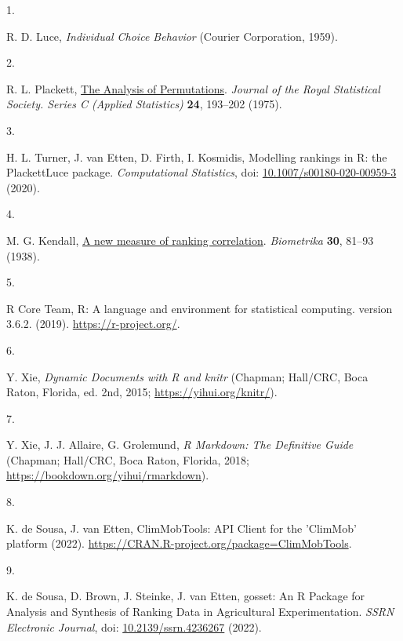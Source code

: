 \documentclass[
]{article}
\newlength{\cslhangindent}
\newlength{\csllabelwidth}
\newenvironment{CSLReferences}[2] %
 {\begin{list}{}{%
  \setlength{\itemindent}{0pt}
  \setlength{\leftmargin}{0pt}
  \setlength{\parsep}{0pt}
  \ifodd #1
   \setlength{\leftmargin}{\cslhangindent}
   \setlength{\itemindent}{-1\cslhangindent}
  \fi
  \setlength{\itemsep}{#2\baselineskip}}}
 {\end{list}}
\newcommand{\CSLLeftMargin}[1]{\parbox[t]{\csllabelwidth}{\strut#1\strut}}
\newcommand{\CSLRightInline}[1]{\parbox[t]{\linewidth - \csllabelwidth}{\strut#1\strut}}
\begin{document}
\label{refs}
\begin{CSLReferences}{0}{1}
\CSLLeftMargin{1. }%
\CSLRightInline{R. D. Luce, \emph{{Individual Choice Behavior}} (Courier
Corporation, 1959).}

\CSLLeftMargin{2. }%
\CSLRightInline{R. L. Plackett,
\href{https://doi.org/10.2307/2346567}{{The Analysis of Permutations}}.
\emph{Journal of the Royal Statistical Society. Series C (Applied
Statistics)} \textbf{24}, 193--202 (1975).}

\CSLLeftMargin{3. }%
\CSLRightInline{H. L. Turner, J. van Etten, D. Firth, I. Kosmidis,
{Modelling rankings in R: the PlackettLuce package}. \emph{Computational
Statistics}, doi:
\href{https://doi.org/10.1007/s00180-020-00959-3}{10.1007/s00180-020-00959-3}
(2020).}

\CSLLeftMargin{4. }%
\CSLRightInline{M. G. Kendall,
\href{https://doi.org/10.1093/biomet/30.1-2.81}{{A new measure of
ranking correlation}}. \emph{Biometrika} \textbf{30}, 81--93 (1938).}

\CSLLeftMargin{5. }%
\CSLRightInline{R Core Team, {R: A language and environment for
statistical computing. version 3.6.2.} (2019).
\url{https://r-project.org/}.}

\CSLLeftMargin{6. }%
\CSLRightInline{Y. Xie, \emph{{Dynamic Documents with {R} and knitr}}
(Chapman; Hall/CRC, Boca Raton, Florida, ed. 2nd, 2015;
\url{https://yihui.org/knitr/}).}

\CSLLeftMargin{7. }%
\CSLRightInline{Y. Xie, J. J. Allaire, G. Grolemund, \emph{{R Markdown:
The Definitive Guide}} (Chapman; Hall/CRC, Boca Raton, Florida, 2018;
\url{https://bookdown.org/yihui/rmarkdown}).}

\CSLLeftMargin{8. }%
\CSLRightInline{K. de Sousa, J. van Etten, {{ClimMobTools}: API Client
for the {'ClimMob'} platform} (2022).
\url{https://CRAN.R-project.org/package=ClimMobTools}.}

\CSLLeftMargin{9. }%
\CSLRightInline{K. de Sousa, D. Brown, J. Steinke, J. van Etten,
{gosset: An R Package for Analysis and Synthesis of Ranking Data in
Agricultural Experimentation}. \emph{{SSRN} Electronic Journal}, doi:
\href{https://doi.org/10.2139/ssrn.4236267}{10.2139/ssrn.4236267}
(2022).}


\end{CSLReferences}
\end{document}
